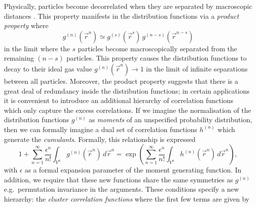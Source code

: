 Physically, particles become decorrelated when they are separated by macroscopic distances%
.
This property manifests in the distribution functions via a \emph{product property} where \cite{UhlenbeckJMP1963}
\begin{equation*}
  g^{(n)}(\vec{r}^n)
  \simeq
  g^{(s)}(\vec{r}^s) \, g^{(n-s)}(\vec{r}^{n-s})
\end{equation*}
in the limit where the $s$ particles become macroscopically separated from the remaining $(n-s)$ particles.
This property causes the distribution functions to decay to their ideal gas value $g^{(n)}(\vec{r}^n) \to 1$ in the limit of infinite separations between all particles.
Moreover, the product property suggests that there is a great deal of redundancy inside the distribution functions; in certain applications it is convenient to introduce an additional hierarchy of correlation functions which only capture the excess correlations.
If we imagine the normalisation of the distribution functions $g^{(n)}$ as \emph{moments} of an unspecified probability distribution, then we can formally imagine a dual set of correlation functions $h^{(n)}$ which generate the \emph{cumulants}.
Formally, this relationship is expressed \cite{Santos2016}
\begin{equation*}\label{eq:correlation-moment-generating-function}
  1
  + \sum_{n=1}^\infty \frac{\epsilon^n}{n!}
  \int_{V^n} g^{(n)}(\vec{r}^n) \, d\vec{r}^n
  =
  \exp{
    \left(
    \sum_{n=1}^\infty \frac{\epsilon^n}{n!}
    \int_{V^n} h^{(n)}(\vec{r}^n) \, d\vec{r}^n
    \right)
  },
\end{equation*}
with $\epsilon$ as a formal expansion parameter of the moment generating function.
In addition, we require that these new functions share the same symmetries as $g^{(n)}$ e.g.\ permutation invariance in the arguments.
These conditions specify a new hierarchy: the \emph{cluster correlation functions}%
where the first few terms are given by \cite{UhlenbeckJMP1963}
